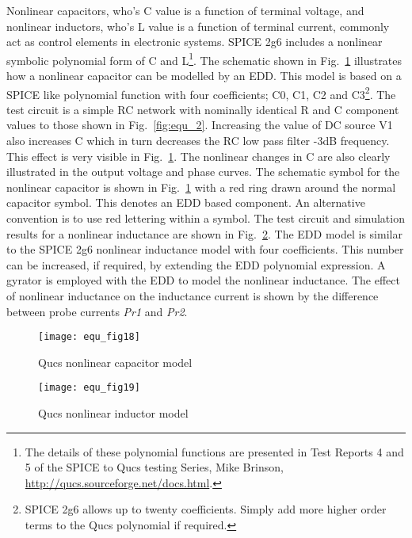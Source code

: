 Nonlinear capacitors, who's C value is a function of terminal voltage,
and nonlinear inductors, who's L value is a function of terminal
current, commonly act as control elements in electronic systems. SPICE
2g6 includes a nonlinear symbolic polynomial form of C and
L\footnote{The details of these polynomial functions are presented in
Test Reports 4 and 5 of the SPICE to Qucs testing Series, Mike
Brinson, \url{http://qucs.sourceforge.net/docs.html}.}. The schematic
shown in Fig.~\ref{fig:equ_18} illustrates how a nonlinear capacitor
can be modelled by an EDD. This model is based on a SPICE like
polynomial function with four coefficients; C0, C1, C2 and
C3\footnote{SPICE 2g6 allows up to twenty coefficients. Simply add
more higher order terms to the Qucs polynomial if required.}. The test
circuit is a simple RC network with nominally identical R and C
component values to those shown in Fig.~\ref{fig:equ_2}. Increasing
the value of DC source V1 also increases C which in turn decreases the
RC low pass filter -3dB frequency. This effect is very visible in
Fig.~\ref{fig:equ_18}. The nonlinear changes in C are also clearly
illustrated in the output voltage and phase curves. The schematic
symbol for the nonlinear capacitor is shown in Fig.~\ref{fig:equ_18}
with a red ring drawn around the normal capacitor symbol. This denotes
an EDD based component. An alternative convention is to use red
lettering within a symbol. The test circuit and simulation results for
a nonlinear inductance are shown in Fig.~\ref{fig:equ_19}. The EDD
model is similar to the SPICE 2g6 nonlinear inductance model with four
coefficients. This number can be increased, if required, by extending
the EDD polynomial expression. A gyrator is employed with the EDD to
model the nonlinear inductance. The effect of nonlinear inductance on
the inductance current is shown by the difference between probe
currents \textit{Pr1} and \textit{Pr2}.


 

\begin{figure}[h]
  \centering
  \texttt{[image: equ\_fig18]} 
  \caption{Qucs nonlinear capacitor model} 
  \label{fig:equ_18} 
\end{figure} 

\begin{figure}[h] 
  \centering
  \texttt{[image: equ\_fig19]} 
  \caption{Qucs nonlinear inductor model} 
  \label{fig:equ_19}
\end{figure} 



